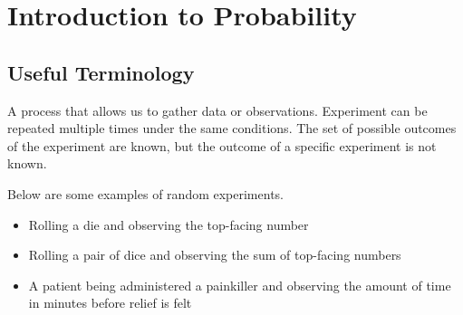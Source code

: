 \chapter{Introduction to Probability}

\section{Useful Terminology}

\begin{definition}
    A process that allows us to gather data or observations. Experiment can be repeated multiple times under the same conditions. The set of possible outcomes of the experiment are known, but the outcome of a specific experiment is not known.
\end{definition}

\begin{example}
    Below are some examples of random experiments. 

    \begin{itemize}
        \item Rolling a die and observing the top-facing number 
        \item Rolling a pair of dice and observing the sum of top-facing numbers 
        \item A patient being administered a painkiller and observing the amount of time in minutes before relief is felt
    \end{itemize}
\end{example}

\begin{definition}
    
\end{definition}